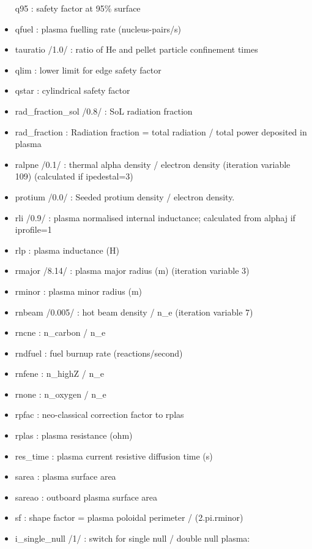 \documentclass[]{article}
\begin{document}
\begin{itemize}
  q95 : safety factor at 95\% surface
\item
  qfuel : plasma fuelling rate (nucleus-pairs/s)
\item
  tauratio /1.0/ : ratio of He and pellet particle confinement times
\item
  qlim : lower limit for edge safety factor
\item
  qstar : cylindrical safety factor
\item
  rad\_fraction\_sol /0.8/ : SoL radiation fraction
\item
  rad\_fraction : Radiation fraction = total radiation / total power
  deposited in plasma
\item
  ralpne /0.1/ : thermal alpha density / electron density (iteration
  variable 109) (calculated if ipedestal=3)
\item
  protium /0.0/ : Seeded protium density / electron density.
\item
  rli /0.9/ : plasma normalised internal inductance; calculated from
  alphaj if iprofile=1
\item
  rlp : plasma inductance (H)
\item
  rmajor /8.14/ : plasma major radius (m) (iteration variable 3)
\item
  rminor : plasma minor radius (m)
\item
  rnbeam /0.005/ : hot beam density / n\_e (iteration variable 7)
\item
  rncne : n\_carbon / n\_e
\item
  rndfuel : fuel burnup rate (reactions/second)
\item
  rnfene : n\_highZ / n\_e
\item
  rnone : n\_oxygen / n\_e
\item
  rpfac : neo-classical correction factor to rplas
\item
  rplas : plasma resistance (ohm)
\item
  res\_time : plasma current resistive diffusion time (s)
\item
  sarea : plasma surface area
\item
  sareao : outboard plasma surface area
\item
  sf : shape factor = plasma poloidal perimeter / (2.pi.rminor)
\item
  i_single_null /1/ : switch for single null / double null plasma:


\end{itemize}
\end{document}
